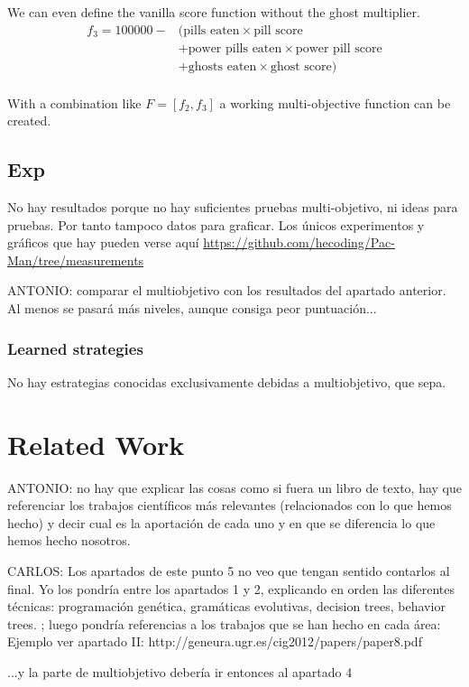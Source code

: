 \documentclass{llncs}
\begin{document}
We can even define the vanilla score function without the ghost multiplier.
\begin{equation}
\begin{split}
f_3 = 100000 - & (\text{pills eaten} \times \text{pill score} \\
& + \text{power pills eaten} \times \text{power pill score} \\
& + \text{ghosts eaten} \times \text{ghost score}) \\
\end{split}
\end{equation}

With a combination like $F = [f_2, f_3]$ a working multi-objective function can be created.

\subsection{Exp}
{\color{red} No hay resultados porque no hay suficientes pruebas multi-objetivo, ni ideas para pruebas. Por tanto tampoco datos para graficar. Los únicos experimentos y gráficos que hay pueden verse aquí \url{https://github.com/hecoding/Pac-Man/tree/measurements}}

{\color{red}ANTONIO: comparar el multiobjetivo con los resultados del apartado anterior. Al menos se pasará más niveles, aunque consiga peor puntuación...}

\subsubsection{Learned strategies}
{\color{red}No hay estrategias conocidas exclusivamente debidas a multiobjetivo, que sepa.}

%
\section{Related Work}
\label{sec:relatedWork}
%

{\color{red}ANTONIO: no hay que explicar las cosas como si fuera un libro de texto, hay que referenciar los trabajos científicos más relevantes (relacionados con lo que hemos hecho) y decir cual es la aportación de cada uno y en que se diferencia lo que hemos hecho nosotros.}

{\color{red}CARLOS: Los apartados de este punto 5 no veo que tengan sentido contarlos al final. Yo los pondría entre los apartados 1 y 2, explicando en orden las diferentes técnicas: programación genética, gramáticas evolutivas, decision trees, behavior trees. ; luego pondría referencias a los trabajos que se han hecho en cada área: Ejemplo ver apartado II: http://geneura.ugr.es/cig2012/papers/paper8.pdf

...y la parte de multiobjetivo debería ir entonces al apartado 4}
\end{document}
